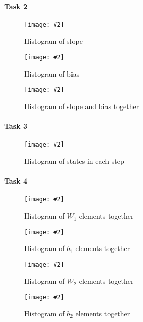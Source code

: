 \documentclass{article}
\newcommand{\centerfigcap}[3]{\begin{figure}[H]
\begin{center}\texttt{[image: \#2]} \caption{#3}\end{center}
\end{figure}}
\begin{document}
\paragraph{Task 2}
\centerfigcap{0.6}{../Results/graph_2_slope}{Histogram of slope}
\centerfigcap{0.6}{../Results/graph_2_bias}{Histogram of bias}
\centerfigcap{0.7}{../Results/graph_2_both}{Histogram of slope and bias together}
\paragraph{Task 3}
\centerfigcap{1}{../Results/graph_3}{Histogram of states in each step}
\paragraph{Task 4}
\centerfigcap{0.7}{../Results/graph_4_w1}{Histogram of $W_1$ elements together}
\centerfigcap{0.7}{../Results/graph_4_b1}{Histogram of $b_1$ elements together}
\centerfigcap{1}{../Results/graph_4_w2}{Histogram of $W_2$ elements together}
\centerfigcap{0.7}{../Results/graph_4_b2}{Histogram of $b_2$ elements together}
\end{document}
